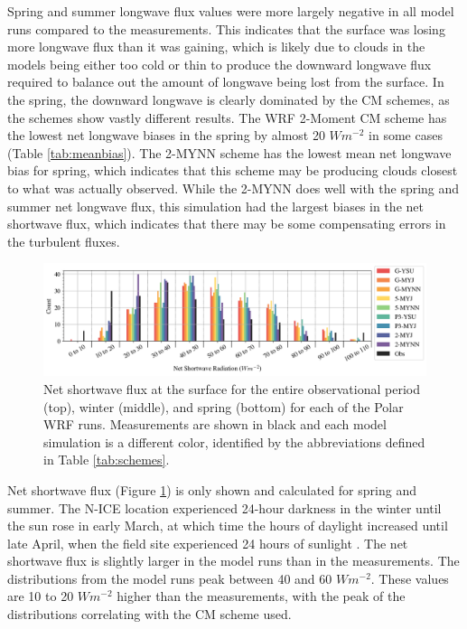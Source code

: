  Spring and summer longwave flux values were more largely negative in all model runs compared to the measurements. This indicates that the surface was losing more longwave flux than it was gaining, which is likely due to clouds in the models being either too cold or thin to produce the downward longwave flux required to balance out the amount of longwave being lost from the surface. In the spring, the downward longwave is clearly dominated by the CM schemes, as the schemes show vastly different results. The WRF 2-Moment CM scheme has the lowest net longwave biases in the spring by almost 20 $Wm^{-2}$ in some cases (Table \ref{tab:meanbias}). The 2-MYNN scheme has the lowest mean net longwave bias for spring, which indicates that this scheme may be producing clouds closest to what was actually observed. While the 2-MYNN does well with the spring and summer net longwave flux, this simulation had the largest biases in the net shortwave flux, which indicates that there may be some compensating errors in the turbulent fluxes.

\begin{figure}[h!]
    \centering
    \includegraphics[width=1\linewidth]{figures/chapter3/WRF_NetSW_Histo.png}
    \caption[Polar WRF simulated net shortwave flux histograms.]{Net shortwave flux at the surface for the entire observational period (top), winter (middle), and spring (bottom) for each of the Polar WRF runs. Measurements are shown in black and each model simulation is a different color, identified by the abbreviations defined in Table \ref{tab:schemes}.}
    \label{fig:wrf_netsw}
\end{figure}

Net shortwave flux (Figure \ref{fig:wrf_netsw}) is only shown and calculated for spring and summer. The N-ICE location experienced 24-hour darkness in the winter until the sun rose in early March, at which time the hours of daylight increased until late April, when the field site experienced 24 hours of sunlight \citep{walden:2017}. The net shortwave flux is slightly larger in the model runs than in the measurements. The distributions from the model runs peak between 40 and 60 $Wm^{-2}$. These values are 10 to 20 $Wm^{-2}$ higher than the measurements, with the peak of the distributions correlating with the CM scheme used. 

